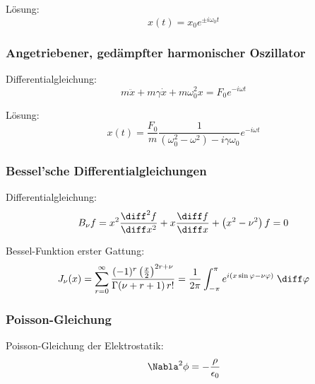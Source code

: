 \documentclass[11pt]{article}
\numberwithin{equation}{section}
\begin{document}
        Lösung:
        \begin{equation}
          x(t)=x_0 e^{\pm i\omega_0 t}
        \end{equation}

      \subsubsection{Angetriebener, gedämpfter harmonischer Oszillator}
        Differentialgleichung:
        \begin{equation}
          m\ddot{x}+m\gamma\dot{x}+m\omega_0^2 x = F_0 e^{-i\omega t}
        \end{equation}

        Lösung:
        \begin{equation}
          x(t) = \frac{F_0}{m} \frac{1}{\left(\omega_0^2-\omega^2\right)-i\gamma\omega_0} e^{-i\omega t}
        \end{equation}

      \subsubsection{Bessel'sche Differentialgleichungen}
        Differentialgleichung:
        \begin{equation}
          B_\nu f = x^2\frac{\diff^2 f}{\diff x^2} + x\tder{f}{x}+\left(x^2-\nu^2\right)f = 0
        \end{equation}

        Bessel-Funktion erster Gattung:
        \begin{equation}
          J_\nu(x) = \sum_{r=0}^\infty \frac{(-1)^r\left(\frac{x}{2}\right)^{2r+\nu}}{\Gamma(\nu+r+1)\,r!} = \frac{1}{2\pi}\int_{-\pi}^{\pi} e^{i(x\sin\varphi-\nu\varphi)}\;\diff\varphi
        \end{equation}

      \subsubsection{Poisson-Gleichung}
        Poisson-Gleichung der Elektrostatik:
        \begin{equation}
          \Nabla^2\phi = -\frac{\rho}{\epsilon_0}
        \end{equation}
\end{document}
